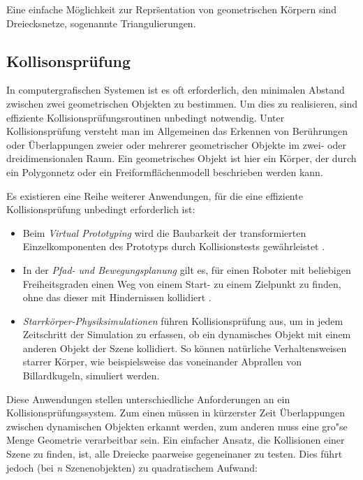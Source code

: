 Eine einfache M\"oglichkeit zur Repr\"sentation von geometrischen K\"orpern sind Dreiecksnetze, sogenannte Triangulierungen.

\subsection{Kollisonspr\"ufung}

In computergrafischen Systemen ist es oft erforderlich, den minimalen Abstand zwischen zwei geometrischen Objekten zu bestimmen. Um dies zu realisieren, sind effiziente Kollisionspr\"ufungsroutinen unbedingt notwendig. Unter
Kollisionspr\"ufung versteht man im Allgemeinen das Erkennen von Ber\"uhrungen
oder \"Uberlappungen zweier oder mehrerer geometrischer Objekte im zwei- oder dreidimensionalen Raum.
Ein geometrisches Objekt ist hier ein K\"orper, der durch ein Polygonnetz oder
ein Freiformfl\"achenmodell beschrieben werden kann.

Es existieren eine Reihe weiterer Anwendungen, f\"ur die eine effiziente Kollisions\-pr\"ufung
unbedingt erforderlich ist:

\begin{itemize}
	\item Beim {\em Virtual Prototyping} wird die Baubarkeit der transformierten
	Einzelkomponenten des Prototyps durch Kollisionstests gew\"ahrleistet
    \cite{zachmannThesis}.
	\item In der {\em Pfad- und Bewegungsplanung} gilt es, f\"ur einen Roboter mit
	beliebigen Freiheitsgraden einen Weg von einem Start- zu einem Zielpunkt zu
	finden, ohne das dieser mit Hindernissen kollidiert \cite{lavalle}.
	\item {\em Starrk\"orper-Physiksimulationen}  f\"uhren Kollisionspr\"ufung aus,
	um in jedem Zeitschritt der Simulation zu erfassen, ob ein dynamisches Objekt mit einem
	anderen Objekt der Szene kollidiert. So k\"onnen nat\"urliche
	Verhaltensweisen starrer K\"orper, wie beispielsweise das voneinander Abprallen
	von Billardkugeln, simuliert werden.
\end{itemize}

Diese Anwendungen stellen unterschiedliche Anforderungen an ein
Kollisionspr\"ufungssystem. Zum einen m\"ussen in k\"urzerster Zeit \"Uberlappungen
zwischen dynamischen Objekten erkannt werden, zum anderen muss eine
gro"se Menge Geometrie verarbeitbar sein. Ein einfacher Ansatz, die Kollisionen
einer Szene zu finden, ist, alle Dreiecke paarweise gegeneinaner
zu testen. Dies f\"uhrt jedoch (bei  {\em n}
Szenenobjekten) zu quadratischem Aufwand:

